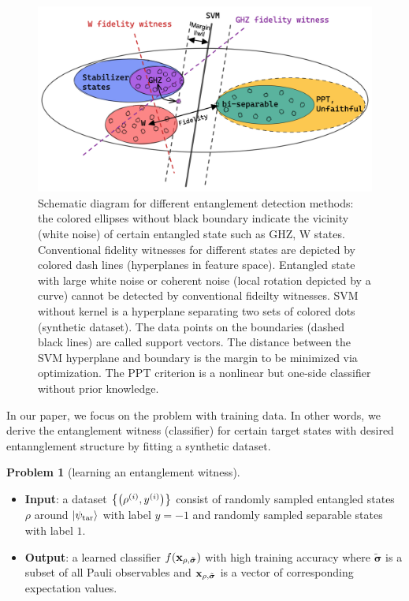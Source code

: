 \documentclass[
aps,
pra,
twocolumn,
floatfix,
]{revtex4-2}
\theoremstyle{plain}
\theoremstyle{definition}
\newtheorem{problem}{Problem}
\newcommand{\dm}{\rho}
\newcommand{\target}{\textup{tar}}
\newcommand{\bmsigma}{\bm{\sigma}}
\begin{document}
\begin{figure}[!ht]
	\centering
		\centering
		\includegraphics[width=.56\linewidth]{schematic.png}
	\caption{Schematic diagram for different entanglement detection methods: the colored ellipses without black boundary indicate the vicinity (white noise) of certain entangled state such as GHZ, W states. Conventional fidelity witnesses for different states are depicted by colored dash lines (hyperplanes in feature space). Entangled state with large white noise or coherent noise (local rotation depicted by a curve) cannot be detected by conventional fideilty witnesses. SVM without kernel is a hyperplane separating two sets of colored dots (synthetic dataset). The data points on the boundaries (dashed black lines) are called support vectors. The distance between the SVM hyperplane and boundary is the margin to be minimized via optimization. The PPT criterion is a nonlinear but one-side classifier without prior knowledge.}
	\label{fig:entangle}
\end{figure}

In our paper, we focus on the  problem with training data.
In other words, we derive the entanglement witness (classifier) for certain target states with desired entannglement structure by fitting a synthetic dataset.
\begin{problem}[learning an entanglement witness]\label{prm:learn_witness}
	\;
	\begin{itemize}
		\item \textbf{Input}: a dataset $\qty{\qty(\dm^{(i)},y^{(i)})}$ consist of randomly sampled entangled states $\dm$ around $\ket{\psi_{\target}}$ with label $y=-1$ and randomly sampled separable states with label $1$.
		\item \textbf{Output}: a learned classifier $f(\vbx_{\dm,\tilde{\bmsigma}})$ with high training accuracy where $\tilde{\bmsigma}$ is a subset of all Pauli observables and $\vbx_{\dm,\tilde{\bmsigma}}$ is a vector of corresponding expectation values.
	\end{itemize}
\end{problem}
\end{document}
